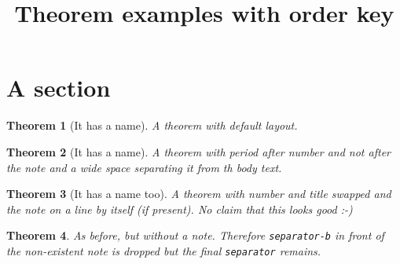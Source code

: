 \documentclass{article}
\title{Theorem examples with order key}
\newtheorem{thm}{Theorem}[section]
\begin{document}
\section{A section}

\DebugTemplatesOn  %

\begin{thm}[It has a name]
  A theorem with default layout.
\end{thm}


\begin{thm}[It has a name]
  A theorem with period after number and not after the note and a wide
  space separating it from th body text.
\end{thm}


\begin{thm}[It has a name too]
  A theorem with number and title swapped and the note on a line by
  itself (if present).  No claim that this looks good :-)
\end{thm}

\begin{thm}
  As before, but without a note. Therefore \texttt{separator-b} in
  front of the non-existent note is dropped but the final
  \texttt{separator} remains.
\end{thm}
\end{document}
